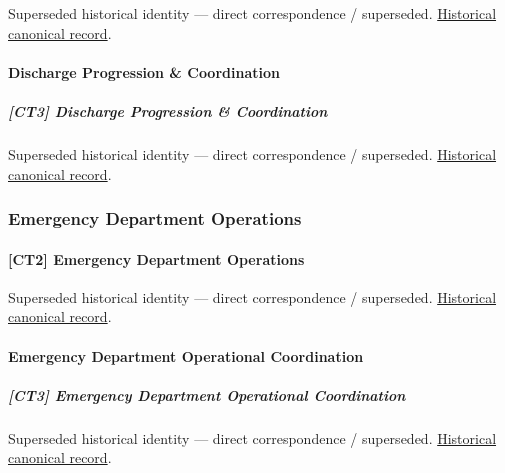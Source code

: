 \par\label{element:c57c0721ab0040ccb24e88e5e92e8cf8}
Superseded historical identity — direct correspondence / superseded. \href{../../../../continuum/strategy/capability/c57c0721ab0040ccb24e88e5e92e8cf8.md}{Historical canonical record}.\par

\paragraph{Discharge Progression \& Coordination}

\subparagraph{[CT3] Discharge Progression \& Coordination}

\par\label{element:68344272ca6049648a3ddae20c150f37}
Superseded historical identity — direct correspondence / superseded. \href{../../../../continuum/strategy/capability/68344272ca6049648a3ddae20c150f37.md}{Historical canonical record}.\par

\subsubsection{Emergency Department Operations}

\paragraph{[CT2] Emergency Department Operations}

\par\label{element:8963b571e9cc40e49c5d738e31d2f97e}
Superseded historical identity — direct correspondence / superseded. \href{../../../../continuum/strategy/capability/8963b571e9cc40e49c5d738e31d2f97e.md}{Historical canonical record}.\par

\paragraph{Emergency Department Operational Coordination}

\subparagraph{[CT3] Emergency Department Operational Coordination}

\par\label{element:15b6d2518e60444098b7c546ca31c49b}
Superseded historical identity — direct correspondence / superseded. \href{../../../../continuum/strategy/capability/15b6d2518e60444098b7c546ca31c49b.md}{Historical canonical record}.\par

